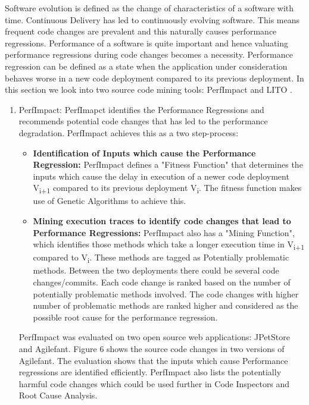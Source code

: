 \documentclass[article,type=msc,colorback,12pt,accentcolor=tud7b,table]{tudthesis}
\begin{document}
	 Software evolution is defined as the change of characteristics of a software with time. Continuous Delivery has led to continuously evolving software. This means frequent code changes are prevalent and this naturally causes performance regressions. Performance of a software is quite important and hence valuating performance regressions during code changes becomes a necessity. Performance regression can be defined as a state when the application under consideration behaves worse in a new code deployment compared to its previous deployment. In this section we look into two source code mining tools: PerfImpact \cite{luomining} and LITO \cite{sandoval2016learning}.
	 \begin{enumerate}
	 \item{PerfImpact:} 
	 PerfImapct identifies the Performance Regressions and recommends potential code changes that has led to the performance degradation. PerfImpact achieves this as a two step-process: 
	 
	 \begin{itemize}
\item{\textbf{Identification of Inputs which cause the Performance Regression:}} 
\newline
PerfImpact defines a "Fitness Function" that determines the inputs which cause the delay in execution of a newer code deployment V\textsubscript{i+1} compared to its previous deployment V\textsubscript{i}. The fitness function makes use of Genetic Algorithms to achieve this. 
 
\item {\textbf{Mining execution traces to identify code changes that lead to Performance Regressions:}} 
\newline
PerfImpact also has a "Mining Function", which identifies those methods which take a longer execution time in V\textsubscript{i+1} compared to V\textsubscript{i}. These methods are tagged as Potentially problematic methods. Between the two deployments there could be several code changes/commits. Each code change is ranked based on the number of potentially problematic methods involved. The code changes with higher number of problematic methods are ranked higher and considered as the possible root cause for the performance regression. 	 
	 
	 \end{itemize}
	
PerfImpact was evaluated on two open source web applications: JPetStore\cite{Jpetstore} and Agilefant\cite{Agilefant}. Figure 6 shows the source code changes in two versions of Agilefant. The evaluation shows that the inputs which cause Performance regressions are identified efficiently. PerfImpact also lists the potentially harmful code changes which could be used further in Code Inspectors and Root Cause Analysis.


\end{enumerate}
\end{document}
